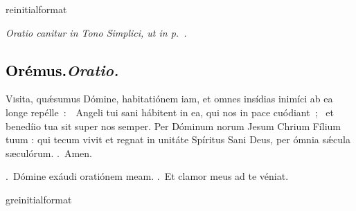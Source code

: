 \documentclass[12pt]{article} %
\newcommand{\myaboveinitial}[1]{%
    \expandafter\renewcommand\csname greinitialformat\endcsname[1]{%
        \fontsize{43}{43}\selectfont ##1
    }
    \gresetfirstlineaboveinitial{\textcolor{benred8}{\raisebox{6.0mm}{\small \textsc{\textbf{#1}}}}}{}
}
\newenvironment{rubric}{\vspace{1 mm}\color{benred8} \itshape \leftskip 0in \setlength{\parindent}{0.25in}}{\vspace{1 mm}}
\newenvironment{response}{\leftskip 0in \setlength{\parindent}{0in}}{\vspace{1 mm}}
\let\oldgresixstar\gresixstar
\renewcommand{\gresixstar}{\textcolor{benred8}{\oldgresixstar}}
\let\oldgredagger\gredagger
\renewcommand{\gredagger}{\textcolor{benred8}{\oldgredagger}}
\let\oldVbar\Vbar
\renewcommand{\Vbar}{\textcolor{benred8}{\oldVbar .}}
\let\oldRbar\Rbar
\renewcommand{\Rbar}{\textcolor{benred8}{\oldRbar .}}
\def\capitulumSpace{\hspace{20 mm}}
\begin{document}
\begin{pages}
\begin{Leftside}
\begin{response}
\end{response}

\pend\pstart


\myaboveinitial{\Vbar}

\pend\pstart


\begin{rubric}
Oratio canitur in Tono Simplici, ut in p.~\pageref{OratioSimplex}.

\end{rubric}

\pend\pstart

\subsection*{\textcolor{black}{Or\'{e}mus.}\capitulumSpace \emph{Oratio.}}

\pend\pstart

\begin{response}\lettrine{V}{i}sita, qu\'{\ae}sumus D\'{o}mine, habitati\'{o}nem iam, et omnes ins\'{i}dias inim\'{i}ci ab ea longe rep\'{e}lle~:~\gredagger\ Angeli tui sani h\'{a}bitent in ea, qui nos in pace cu\'{o}diant~; \gresixstar\ et bened\'{i}io tua sit super nos semper. Per D\'{o}minum norum Jesum Chrium F\'{i}lium tuum : qui tecum vivit et regnat in unit\'{a}te Sp\'{i}ritus Sani Deus, per \'{o}mnia s\'{\ae}cula s\ae cul\'{o}rum. \Rbar\ Amen.

\end{response}

\pend\pstart

\begin{response}
\Vbar\ Dómine exáudi oratiónem meam. \Rbar\ Et clamor meus ad te véniat.

\end{response}

\pend\pstart


\myaboveinitial{II}

\pend\pstart


\end{Leftside}
\end{pages}
\end{document}
